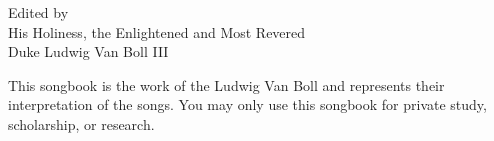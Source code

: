 \documentclass[11pt,a5paper,wordbk]{../SSSongbook}
\begin{document}
\let\cleardoublepage\clearpage %

{Edited by\\
  His Holiness, the Enlightened and Most Revered\\
Duke Ludwig Van Boll III}

\ifChordBk
\let\cleardoublepage\clearpage %
\fancyhead[R,L]{}
\tableofcontents %
\vfil
This songbook is the work of the Ludwig Van Boll
and represents their interpretation of the songs.
You may only use this songbook for private study,
scholarship, or research.\par
\pagebreak
\fi














\ifChordBk
\printindex
\fi
\end{document}
